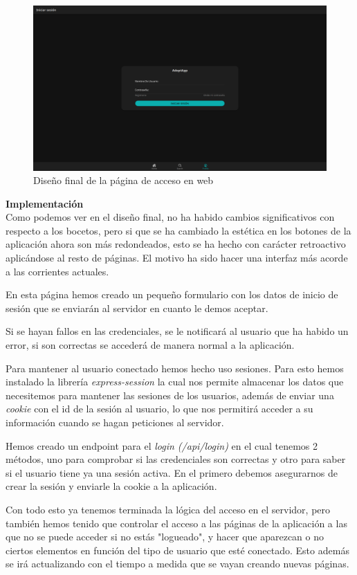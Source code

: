 \begin{figure}[H]
	\centering
	\includegraphics[width=0.7\linewidth]{"sprint 2/hu6/ImpLoginWeb"}
	\caption{Diseño final de la página de acceso en web}
	\label{fig:imploginweb}
\end{figure}

\textbf{Implementación} \\

Como podemos ver en el diseño final, no ha habido cambios significativos con respecto a los bocetos, pero si que se ha cambiado la estética en los botones de la aplicación ahora son más redondeados, esto se ha hecho con carácter retroactivo aplicándose al resto de páginas. El motivo ha sido hacer una interfaz más acorde a las corrientes actuales.

En esta página hemos creado un pequeño formulario con los datos de inicio de sesión que se enviarán al servidor en cuanto le demos aceptar.

Si se hayan fallos en las credenciales, se le notificará al usuario que ha habido un error, si son correctas se accederá de manera normal a la aplicación.

Para mantener al usuario conectado hemos hecho uso sesiones. Para esto hemos instalado la librería \textit{express-session} la cual nos permite almacenar los datos que necesitemos para mantener las sesiones de los usuarios, además de enviar una \textit{cookie} con el id de la sesión al usuario, lo que nos permitirá acceder a su información cuando se hagan peticiones al servidor.

Hemos creado un endpoint para el \textit{login (/api/login)} en el cual tenemos 2 métodos, uno para comprobar si las credenciales son correctas y otro para saber si el usuario tiene ya una sesión activa. En el primero debemos asegurarnos de crear la sesión y enviarle la cookie a la aplicación.

Con todo esto ya tenemos terminada la lógica del acceso en el servidor, pero también hemos tenido que controlar el acceso a las páginas de la aplicación a las que no se puede acceder si no estás "logueado", y hacer que aparezcan o no ciertos elementos en función del tipo de usuario que esté conectado. Esto además se irá actualizando con el tiempo a medida que se vayan creando nuevas páginas. \\

